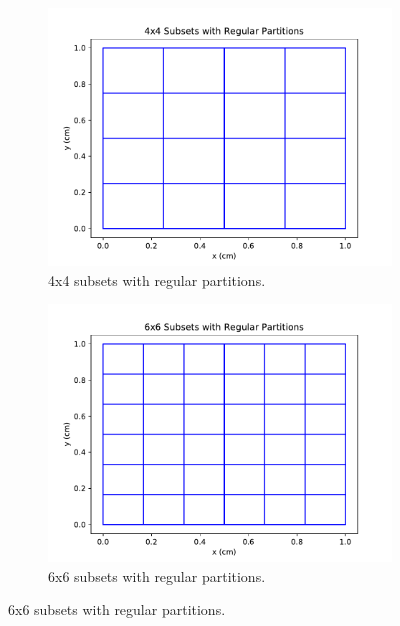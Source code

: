 \begin{figure}[H]
\centering
\begin{subfigure}[b]{0.45\textwidth}
  \includegraphics[width=\textwidth]{../cut_line_files/4_regular.pdf}
  \caption{4x4 subsets with regular partitions.}
  \label{4regular}
\end{subfigure}
\begin{subfigure}[b]{0.45\textwidth}
  \includegraphics[width=\textwidth]{../cut_line_files/6_regular.pdf}
  \caption{6x6 subsets with regular partitions.}
  \label{6regular}
\end{subfigure}


\end{figure}
